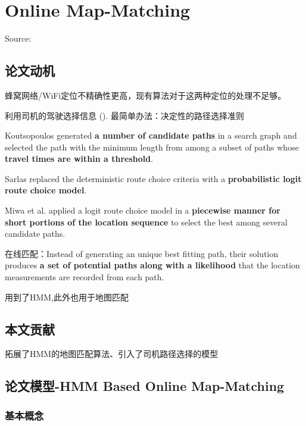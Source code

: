 \chapter{Online Map-Matching}

Source: \cite{Jagadeesh2017} 

\section{论文动机}
    蜂窝网络/WiFi定位不精确性更高，现有算法对于这两种定位的处理不足够。 
    
利用司机的驾驶选择信息 ().
最简单办法：决定性的路径选择准则

\begin{example}
    Koutsopoulos generated \textbf{a number of candidate paths} in a
search graph and selected the path with the minimum length
from among a subset of paths whose \textbf{travel times are within
a threshold}.

Sarlas replaced the deterministic route choice criteria with a
\textbf{probabilistic logit route choice model}.

Miwa et al. applied a logit route choice model in
a \textbf{piecewise manner for short portions of the location sequence}
to select the best among several candidate paths.
\end{example}

在线匹配：Instead of generating an unique best
fitting path, their solution produces \textbf{a set of potential paths
along with a likelihood} that the location measurements are
recorded from each path.

\cite{newson2009hidden} 用到了HMM,此外也用于地图匹配

\section{本文贡献}

拓展了HMM的地图匹配算法、引入了司机路径选择的模型

\section{论文模型-HMM Based Online Map-Matching}

\subsection{基本概念}

